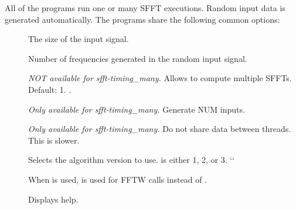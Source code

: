 \documentclass[letterpaper,10pt,english]{sphinxmanual}
\begin{document}
All of the programs run one or many SFFT executions. Random input data is
generated automatically. The programs share the following common options:
\begin{description}
\item[{}] \leavevmode
The size of the input signal.

\item[{}] \leavevmode
Number of frequencies generated in the random input signal.

\item[{}] \leavevmode
\emph{NOT available for sfft-timing\_many.} Allows to compute multiple SFFTs.
Default: 1. .

\item[{}] \leavevmode
\emph{Only available for sfft-timing\_many.} Generate NUM inputs.

\item[{}] \leavevmode
\emph{Only available for sfft-timing\_many.} Do not share data between
threads. This is slower.

\item[{}] \leavevmode
Selects the algorithm version to use.  is either 1, 2, or 3. {}`{}`

\item[{}] \leavevmode
When  is used,  is used for FFTW calls instead of
.

\item[{}] \leavevmode
Displays help.

\end{description}
\end{document}
